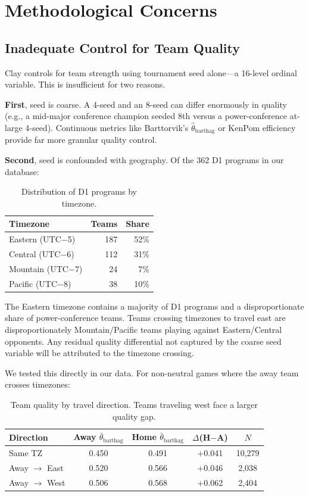 \documentclass[11pt]{article}
\begin{document}
\section{Methodological Concerns}

\subsection{Inadequate Control for Team Quality}

Clay controls for team strength using tournament seed alone---a 16-level ordinal variable. This is insufficient for two reasons.

\textbf{First}, seed is coarse. A 4-seed and an 8-seed can differ enormously in quality (e.g., a mid-major conference champion seeded 8th versus a power-conference at-large 4-seed). Continuous metrics like Barttorvik's $\hat{\theta}_{\text{barthag}}$ or KenPom efficiency provide far more granular quality control.

\textbf{Second}, seed is confounded with geography. Of the 362 D1 programs in our database:

\begin{table}[h]
\centering
\begin{tabular}{lrr}
\toprule
Timezone & Teams & Share \\
\midrule
Eastern (UTC$-$5) & 187 & 52\% \\
Central (UTC$-$6) & 112 & 31\% \\
Mountain (UTC$-$7) & 24 & 7\% \\
Pacific (UTC$-$8) & 38 & 10\% \\
\bottomrule
\end{tabular}
\caption{Distribution of D1 programs by timezone.}
\label{tab:tz_dist}
\end{table}

The Eastern timezone contains a majority of D1 programs and a disproportionate share of power-conference teams. Teams crossing timezones to travel east are disproportionately Mountain/Pacific teams playing against Eastern/Central opponents. Any residual quality differential not captured by the coarse seed variable will be attributed to the timezone crossing.

We tested this directly in our data. For non-neutral games where the away team crosses timezones:

\begin{table}[h]
\centering
\begin{tabular}{lcccc}
\toprule
Direction & Away $\bar{\theta}_{\text{barthag}}$ & Home $\bar{\theta}_{\text{barthag}}$ & $\Delta$(H$-$A) & $N$ \\
\midrule
Same TZ & 0.450 & 0.491 & $+$0.041 & 10{,}279 \\
Away $\rightarrow$ East & 0.520 & 0.566 & $+$0.046 & 2{,}038 \\
Away $\rightarrow$ West & 0.506 & 0.568 & $+$0.062 & 2{,}404 \\
\bottomrule
\end{tabular}
\caption{Team quality by travel direction. Teams traveling west face a larger quality gap.}
\label{tab:quality_confound}
\end{table}
\end{document}
